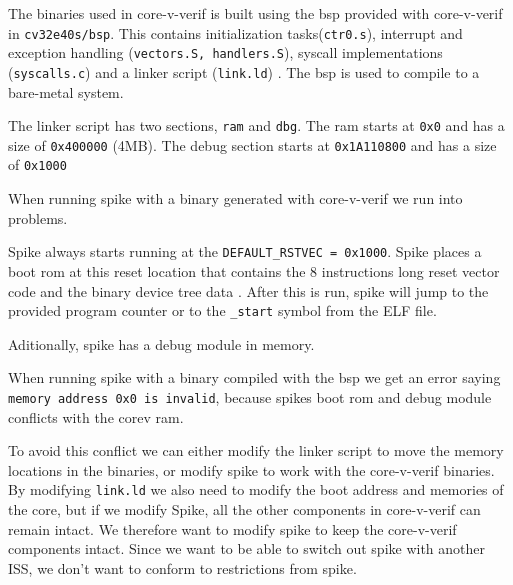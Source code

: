 %
%
%
%
%




The binaries used in core-v-verif is built using the \acrfull{bsp} provided with core-v-verif in \lstinline{cv32e40s/bsp}. This contains initialization tasks(\lstinline{ctr0.s}), interrupt and exception handling (\lstinline{vectors.S, handlers.S}), syscall implementations (\lstinline{syscalls.c}) and a linker script (\lstinline{link.ld}) \cite{CorevverifCv32e40sBsp}. The \acrshort{bsp} is used to compile to a bare-metal system.

The linker script has two sections, \lstinline{ram} and \lstinline{dbg}. The ram starts at \lstinline{0x0} and has a size of \lstinline{0x400000} (4MB). The debug section starts at \lstinline{0x1A110800} and has a size of \lstinline{0x1000}

When running spike with a binary generated with core-v-verif we run into problems.

Spike always starts running at the \lstinline{DEFAULT_RSTVEC = 0x1000}. Spike places a boot rom at this reset location that contains the 8 instructions long reset vector code and the binary device tree data \cite{evancoxAddDocumentationLowlevel2017}.
After this is run, spike will jump to the provided program counter or to the \lstinline{_start} symbol from the ELF file.

Aditionally, spike has a debug module in memory.

When running spike with a binary compiled with the \acrshort{bsp} we get an error saying \lstinline{memory address 0x0 is invalid}, because spikes boot rom and debug module conflicts with the corev ram. 

To avoid this conflict we can either modify the linker script to move the memory locations in the binaries, or modify spike to work with the core-v-verif binaries. By modifying \lstinline{link.ld} we also need to modify the boot address and memories of the core, but if we modify Spike, all the other components in core-v-verif can remain intact. We therefore want to modify spike to keep the core-v-verif components intact. Since we want to be able to switch out spike with another ISS, we don't want to conform to restrictions from spike.

